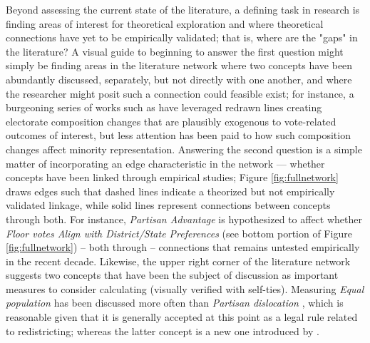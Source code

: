 \documentclass{cup-pan}
\begin{document}
Beyond assessing the current state of the literature, a defining task in research is finding areas of interest for theoretical exploration and where theoretical connections have yet to be empirically validated; that is, where are the "gaps" in the literature? A visual guide to beginning to answer the first question might simply be finding areas in the literature network where two concepts have been abundantly discussed, separately, but not directly with one another, and where the researcher might posit such a connection could feasible exist; for instance, a burgeoning series of works such as \cite{carsey_rethinking_2017, limbocker_campaign_2020, hood_unwelcome_2013, ansolabehere_effects_2012} have leveraged redrawn lines creating electorate composition changes that are plausibly exogenous to vote-related outcomes of interest, but less attention has been paid to how such composition changes affect minority representation. Answering the second question is a simple matter of incorporating an edge characteristic in the network --- whether concepts have been linked through empirical studies; Figure \ref{fig:fullnetwork} draws edges such that dashed lines indicate a theorized but not empirically validated linkage, while solid lines represent connections between concepts through both. For instance, \textit{Partisan Advantage} is hypothesized to affect whether \textit{Floor votes Align with District/State Preferences} (see bottom portion of Figure \ref{fig:fullnetwork}) -- both through \citep{caughey_incremental_2017} -- connections that remains untested empirically in the recent decade. Likewise, the upper right corner of the literature network suggests two concepts that have been the subject of discussion as important measures to consider calculating (visually verified with self-ties). Measuring \textit{Equal population} has been discussed more often than \textit{Partisan dislocation} \citep{gatesman_lattice_2021, magleby_new_2018}, which is reasonable given that it is generally accepted at this point as a legal rule related to redistricting; whereas the latter concept is a new one introduced by \cite{deford_partisan_2021}. 


\end{document}
